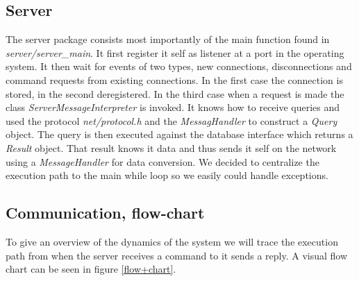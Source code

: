 \documentclass[10pt, a4paper]{article}
\begin{document}
\subsection{Server}
The server package consists most importantly of the main function found in \emph{server/server\_main}. It first register it self as listener at a port in the operating system. It then wait for events of two types, new connections, disconnections and command requests from existing connections. In the first case the connection is stored, in the second deregistered. In the third case when a request is made the class \emph{ServerMessageInterpreter} is invoked. It knows how to receive queries and used the protocol \emph{net/protocol.h} and the \emph{MessagHandler} to construct a \emph{Query} object. The query is then executed against the database interface which returns a \emph{Result} object. That result knows it data and thus sends it self on the network using a \emph{MessageHandler} for data conversion. We decided to centralize the execution path to the main while loop so we easily could handle exceptions.

\subsection{Communication, flow-chart}
To give an overview of the dynamics of the system we will trace the execution path from when the server receives a command to it sends a reply. A visual flow chart can be seen in figure \ref{flow+chart}.
\end{document}
